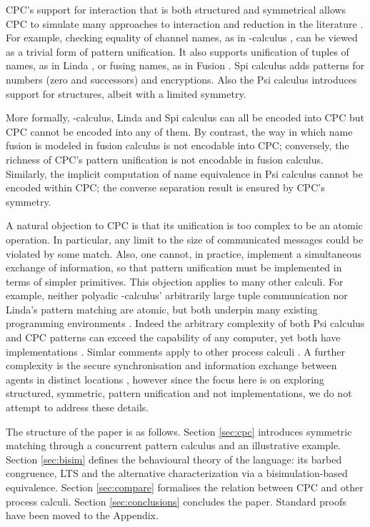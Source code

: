 \documentclass{LMCS}
\begin{document}
CPC's support for interaction that is both structured and symmetrical
allows CPC to simulate many approaches to interaction and reduction in the
literature \cite{G:IC08}.  For example, checking equality of channel names, as in
-calculus \cite{milner.parrow.ea:calculus-mobile}, can be viewed
as a trivial form of pattern unification. It also supports 
unification of tuples of names, as in Linda \cite{Gel85}, or fusing names,
as in Fusion \cite{parrow.victor:fusion-calculus}.  Spi calculus
\cite{gordon1997ccp} adds patterns for numbers (zero and successors)
and encryptions. Also the Psi calculus \cite{BJPV11} introduces
support for structures, albeit with a limited symmetry.

More formally, -calculus, Linda and Spi calculus can all be
encoded into CPC but CPC cannot be encoded into any of them.  By
contrast, the way in which name fusion is modeled in fusion calculus
is not encodable into CPC; conversely, the richness of CPC's pattern
unification is not encodable in fusion calculus. Similarly, the
implicit computation of name equivalence
in Psi calculus cannot be encoded within CPC;
the converse separation result is ensured by CPC's symmetry.

A natural objection to CPC is that its unification is too complex to
be an atomic operation. In particular, any limit to the size of
communicated messages could be violated by some match. Also, one
cannot, in practice, implement a simultaneous exchange of information,
so that pattern unification must be implemented in terms of simpler
primitives.
This objection applies to many other calculi.
For example, neither polyadic -calculus' arbitrarily large tuple communication
nor Linda's pattern matching are atomic, but both underpin many existing programming environments
\cite{Pierce97pict:a,cpplinda,Klava,Lime}.
Indeed the arbitrary complexity of both Psi calculus and CPC patterns can
exceed the capability of any computer, yet both have implementations
\cite{Khorsandiaghai603139,cbondi}.
Simlar comments apply to other process calculi
\cite{20110201:jocaml,nomadic-pict}.
A further complexity is the secure synchronisation and information exchange between agents
in distinct locations \cite{DY83,Fournet07atype,bengtson2011refinement},
however since the focus here is on exploring structured, symmetric, pattern unification
and not implementations, we do not attempt to address these details.

The structure of the paper is as follows.  Section \ref{sec:cpc}
introduces symmetric matching through a concurrent pattern calculus
and an illustrative example. Section \ref{sec:bisim} defines the
behavioural theory of the language: its barbed congruence, LTS and the
alternative characterization via a bisimulation-based equivalence.  Section \ref{sec:compare} formalises the relation between CPC and
other process calculi.
Section \ref{sec:conclusions} concludes the paper.
Standard proofs have been moved to the Appendix.
\end{document}
